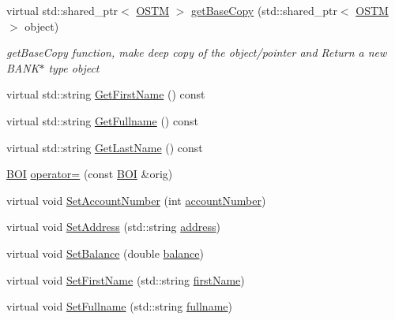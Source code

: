 \begin{DoxyCompactItemize}
\item 
virtual std\+::shared\+\_\+ptr$<$ \hyperlink{class_o_s_t_m}{O\+S\+TM} $>$ \hyperlink{class_b_o_i_ad53ae2918a656793b9d7a670d35ecfa3_ad53ae2918a656793b9d7a670d35ecfa3}{get\+Base\+Copy} (std\+::shared\+\_\+ptr$<$ \hyperlink{class_o_s_t_m}{O\+S\+TM} $>$ object)
\begin{DoxyCompactList}\small\item\em get\+Base\+Copy function, make deep copy of the object/pointer and Return a new B\+A\+N\+K$\ast$ type object \end{DoxyCompactList}\item 
virtual std\+::string \hyperlink{class_b_o_i_ab4b9d50c6008a666aa4382def580e7d1_ab4b9d50c6008a666aa4382def580e7d1}{Get\+First\+Name} () const 
\item 
virtual std\+::string \hyperlink{class_b_o_i_af56446a377068cd65526e40e8b31b878_af56446a377068cd65526e40e8b31b878}{Get\+Fullname} () const 
\item 
virtual std\+::string \hyperlink{class_b_o_i_a37828f3fa4a32f522966e2cad90eaab2_a37828f3fa4a32f522966e2cad90eaab2}{Get\+Last\+Name} () const 
\item 
\hyperlink{class_b_o_i}{B\+OI} \hyperlink{class_b_o_i_a4b4a3976cc13c4d3de0d7ff8882a7af3_a4b4a3976cc13c4d3de0d7ff8882a7af3}{operator=} (const \hyperlink{class_b_o_i}{B\+OI} \&orig)
\item 
virtual void \hyperlink{class_b_o_i_affc9e7e2a36214b3790f250b7108bb65_affc9e7e2a36214b3790f250b7108bb65}{Set\+Account\+Number} (int \hyperlink{class_b_o_i_a35c9fd6e938eb44ad4e076bc6a736851_a35c9fd6e938eb44ad4e076bc6a736851}{account\+Number})
\item 
virtual void \hyperlink{class_b_o_i_a00c9386c862cf2442968bf7fc30102b3_a00c9386c862cf2442968bf7fc30102b3}{Set\+Address} (std\+::string \hyperlink{class_b_o_i_ab9315fe76fd9f07551f5ae7899d33516_ab9315fe76fd9f07551f5ae7899d33516}{address})
\item 
virtual void \hyperlink{class_b_o_i_a416667693c10f5e4120eec97a9269348_a416667693c10f5e4120eec97a9269348}{Set\+Balance} (double \hyperlink{class_b_o_i_aa00a3d8baf3420647c40119b7fa4ed6f_aa00a3d8baf3420647c40119b7fa4ed6f}{balance})
\item 
virtual void \hyperlink{class_b_o_i_ae9042f87be085c2cec799981c30d7d19_ae9042f87be085c2cec799981c30d7d19}{Set\+First\+Name} (std\+::string \hyperlink{class_b_o_i_a12872fd8c15dbf833f78862b00579ed1_a12872fd8c15dbf833f78862b00579ed1}{first\+Name})
\item 
virtual void \hyperlink{class_b_o_i_a93091f16610f1a1474aea31fd5f81ffd_a93091f16610f1a1474aea31fd5f81ffd}{Set\+Fullname} (std\+::string \hyperlink{class_b_o_i_a6d7c892a54bb6f7327cdc777081ab5f4_a6d7c892a54bb6f7327cdc777081ab5f4}{fullname})

\end{DoxyCompactItemize}
